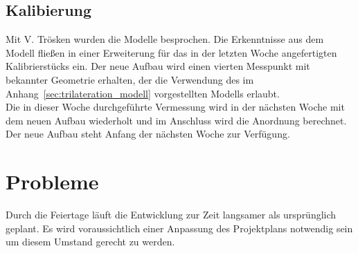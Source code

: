 \documentclass[a4paper,12pt,fleqn]{article}
\begin{document}
\subsection{Kalibierung}
Mit V. Trösken wurden die Modelle besprochen. Die Erkenntnisse aus dem Modell fließen in einer Erweiterung für das in der letzten Woche angefertigten Kalibrierstücks ein. Der neue Aufbau wird einen vierten Messpunkt mit bekannter Geometrie erhalten, der die Verwendung des im Anhang~\ref{sec:trilateration_modell} vorgestellten Modells erlaubt.\\
Die in dieser Woche durchgeführte Vermessung wird in der nächsten Woche mit dem neuen Aufbau wiederholt und im Anschluss wird die Anordnung berechnet.\\
Der neue Aufbau steht Anfang der nächsten Woche zur Verfügung.

\section[Probleme]{Probleme}
Durch die Feiertage läuft die Entwicklung zur Zeit langsamer als ursprünglich geplant. Es wird voraussichtlich einer Anpassung des Projektplans notwendig sein um diesem Umstand gerecht zu werden.



\newpage


\end{document}
